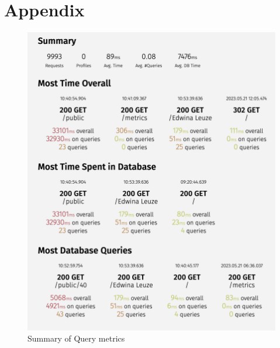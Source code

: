 \section*{Appendix}
\begin{figure}[ht]
    \centering
    \includegraphics[scale = 0.6]{images/silk.png}
    \caption{Summary of Query metrics}
    \label{fig:metrics}
\end{figure}